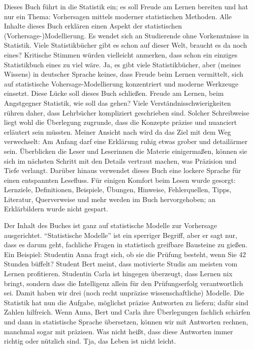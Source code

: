 \documentclass[
  letterpaper,
]{scrbook}
\theoremstyle{definition}
\theoremstyle{definition}
\theoremstyle{definition}
\theoremstyle{remark}
\begin{document}
Dieses Buch führt in die Statistik ein; es soll Freude am Lernen
bereiten und hat nur ein Thema: Vorhersagen mittels moderner
statistischen Methoden. Alle Inhalte dieses Buch erklären einen Aspekt
der statistischen (Vorhersage-)Modellierung. Es wendet sich an
Studierende ohne Vorkenntnisse in Statistik. Viele Statistikbücher gibt
es schon auf dieser Welt, braucht es da noch eines? Kritische Stimmen
würden vielleicht anmerken, dass schon ein einziges Statistikbuch eines
zu viel wäre. Ja, es gibt viele Statistikbücher, aber (meines Wissens)
in deutscher Sprache keines, dass Freude beim Lernen vermittelt, sich
auf statistische Vohersage-Modellierung konzentriert und moderne
Werkzeuge einsetzt. Diese Lücke soll dieses Buch schließen. Freude am
Lernen, beim Angstgegner Statistik, wie soll das gehen? Viele
Verständnisschwierigkeiten rühren daher, dass Lehrbücher kompliziert
geschrieben sind. Solcher Schreibweise liegt wohl die Überlegung
zugrunde, dass die Konzepte präzise und nuanciert erläutert sein
müssten. Meiner Ansicht nach wird da das Ziel mit dem Weg verwechselt:
Am Anfang darf eine Erklärung ruhig etwas grober und detailärmer sein.
Überblicken die Leser und Leserinnen die Materie einigermaßen, können
sie sich im nächsten Schritt mit den Details vertraut machen, was
Präzision und Tiefe verlangt. Darüber hinaus verwendet dieses Buch eine
lockere Sprache für einen entspannten Lesefluss. Für einigen Komfort
beim Lesen wurde gesorgt: Lernziele, Definitionen, Beispiele, Übungen,
Hinweise, Fehlerquellen, Tipps, Literatur, Querverweise und mehr werden
im Buch hervorgehoben; an Erklärbildern wurde nicht gespart.

Der Inhalt des Buches ist ganz auf statistische Modelle zur Vorhersage
ausgerichtet. ``Statistische Modelle'' ist ein sperriger Begriff, aber
er sagt nur, dass es darum geht, fachliche Fragen in statistisch
greifbare Bausteine zu gießen. Ein Beispiel: Studentin Anna fragt sich,
ob sie die Prüfung besteht, wenn Sie 42 Stunden büffelt? Student Bert
meint, dass motivierte Studis am meisten vom Lernen profitieren.
Studentin Carla ist hingegen überzeugt, dass Lernen nix bringt, sondern
dass die Intelligenz allein für den Prüfungserfolg verantwortlich sei.
Damit haben wir drei (noch recht unpräzise wissenschaftliche) Modelle.
Die Statistik hat nun die Aufgabe, möglichst präzise Antworten zu
liefern; dafür sind Zahlen hilfreich. Wenn Anna, Bert und Carla ihre
Überlegungen fachlich schärfen und dann in statistische Sprache
übersetzen, können wir mit Antworten rechnen, manchmal sogar mit
präzisen. Was nicht heißt, dass diese Antworten immer richtig oder
nützlich sind. Tja, das Leben ist nicht leicht.
\end{document}

